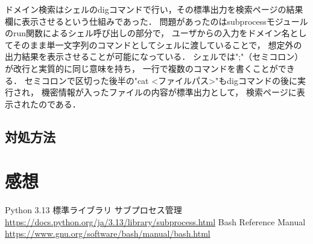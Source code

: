 \documentclass{jlreq}
\begin{document}
ドメイン検索はシェルのdigコマンドで行い，その標準出力を検索ページの結果欄に表示させるという仕組みであった．
問題があったのはsubprocessモジュールのrun関数によるシェル呼び出しの部分で，
ユーザからの入力をドメイン名としてそのまま単一文字列のコマンドとしてシェルに渡していることで，
想定外の出力結果を表示させることが可能になっている．
シェルでは";"（セミコロン）が改行と実質的に同じ意味を持ち，
一行で複数のコマンドを書くことができる．
セミコロンで区切った後半の"cat <ファイルパス>"もdigコマンドの後に実行され，
機密情報が入ったファイルの内容が標準出力として，
検索ページに表示されたのである．

\subsection{対処方法}


\section{感想}

\begin{thebibliography}{99}
     Python 3.13 標準ライブラリ サブプロセス管理 \url{https://docs.python.org/ja/3.13/library/subprocess.html}
     Bash Reference Manual \url{https://www.gnu.org/software/bash/manual/bash.html}
\end{thebibliography}
\end{document}
